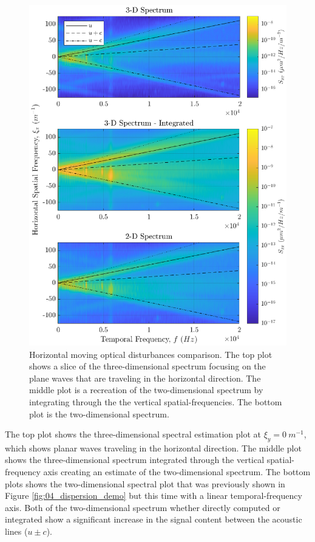 \begin{figure}
  \centering
  \includegraphics{../matlab/04_dispersion_analysis/dispersion_comparison.eps}
  \caption{Horizontal moving optical disturbances comparison. The top plot shows a slice of the three-dimensional spectrum focusing on the plane waves that are traveling in the horizontal direction. The middle plot is a recreation of the two-dimensional spectrum by integrating through the the vertical spatial-frequencies. The bottom plot is the two-dimensional spectrum.}
  \label{fig:04_dispersion_comparison}
\end{figure}
The top plot shows the three-dimensional spectral estimation plot at $\xi_y=0\ m^{-1}$, which shows planar waves traveling in the horizontal direction.
The middle plot shows the three-dimensional spectrum integrated through the vertical spatial-frequency axis creating an estimate of the two-dimensional spectrum.
The bottom plots shows the two-dimensional spectral plot that was previously shown in Figure \ref{fig:04_dispersion_demo} but this time with a linear temporal-frequency axis.
Both of the two-dimensional spectrum whether directly computed or integrated show a significant increase in the signal content between the acoustic lines ($u\pm c$).

